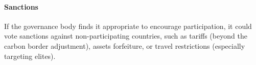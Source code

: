 \documentclass[12pt,english]{article}
\begin{document}




\paragraph{Sanctions}

If the governance body finds it appropriate to encourage participation, it could vote sanctions against non-participating countries, such as tariffs (beyond the carbon border adjustment), assets forfeiture, or travel restrictions (especially targeting elites). 

\end{document}
